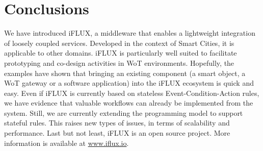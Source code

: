 \section{Conclusions}

We have introduced iFLUX, a middleware that enables a lightweight integration of loosely coupled services. Developed in the context of Smart Cities, it is applicable to other domains. iFLUX is particularly well suited to facilitate prototyping and co-design activities in WoT environments. Hopefully, the examples have shown that bringing an existing component (a smart object, a WoT gateway or a software application) into the iFLUX ecosystem is quick and easy. Even if iFLUX is currently based on stateless Event-Condition-Action rules, we have evidence that valuable workflows can already be implemented from the system. Still, we are currently extending the programming model to support stateful rules. This raises new types of issues, in terms of scalability and performance. Last but not least, iFLUX is an open source project. More information is available at \url{www.iflux.io}.